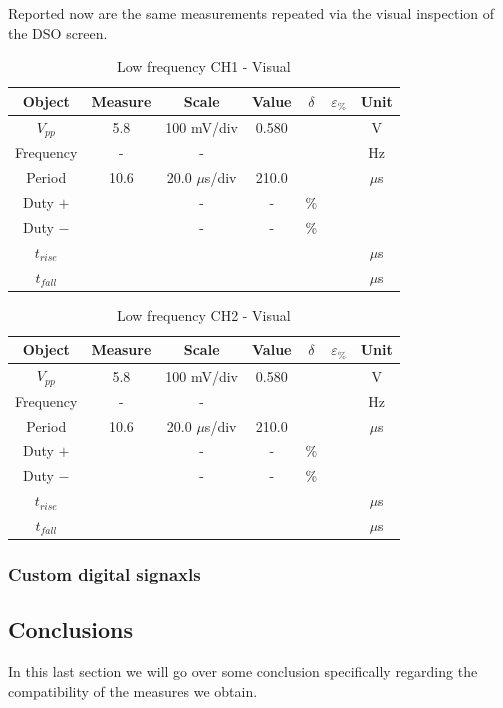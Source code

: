 \documentclass[../main.tex]{subfiles}
\begin{document}
Reported now are the same measurements repeated via the visual inspection of the DSO screen.


\begin{table}[h!]
\centering	

\begin{tabular}{ccccccc}
\textbf{Object} & \textbf{Measure} & \textbf{Scale}  & \textbf{Value}  & \textbf{$\delta$} & \textbf{$\varepsilon_{\%}$} & \textbf{Unit} \\
\hline
 $V_{pp}$ & 5.8 &  100 mV/div & 0.580 & &  & V \\
 \hline
 Frequency & -  & -  &  &  &  & Hz \\
 \hline
 Period &  10.6 &  20.0 $\mu$s/div &  210.0 &  &   & $\mu$s \\
 \hline 
 Duty $+$ &   & -  & - &  \% \\ 
 \hline
 Duty $-$ &   & -  & - &  \% \\ 
 \hline
 $t_{rise}$ &  &   &   &  &  & $\mu$s \\
 \hline
 $t_{fall}$ &   &  &   &  &  & $\mu$s \\

\end{tabular}
\caption*{Low frequency CH1 - Visual}
\end{table}



\begin{table}[h!]
\centering	

\begin{tabular}{ccccccc}
\textbf{Object} & \textbf{Measure} & \textbf{Scale}  & \textbf{Value}  & \textbf{$\delta$} & \textbf{$\varepsilon_{\%}$} & \textbf{Unit} \\
\hline
 $V_{pp}$ & 5.8 &  100 mV/div & 0.580 & &  & V \\
 \hline
 Frequency & -  & -  &  &  &  & Hz \\
 \hline
 Period &  10.6 &  20.0 $\mu$s/div &  210.0 &  &   & $\mu$s \\
 \hline 
 Duty $+$ &   & -  & - &  \% \\ 
 \hline
 Duty $-$ &   & -  & - &  \% \\ 
 \hline
 $t_{rise}$ &  &   &   &  &  & $\mu$s \\
 \hline
 $t_{fall}$ &   &  &   &  &  & $\mu$s \\

\end{tabular}
\caption*{Low frequency CH2 - Visual}
\end{table}






\subsubsection*{Custom digital signaxls}



\subsection{Conclusions}


In this last section we will go over some conclusion specifically regarding the compatibility of the measures we obtain.\\
\end{document}
